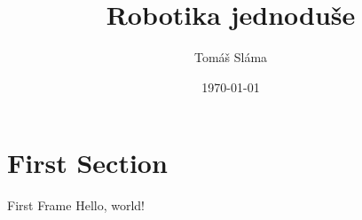 \documentclass[14pt]{beamer}
\title{Robotika jednoduše}
\date{\today}
\author{Tomáš Sláma}
\institute{Gymnázium Turnov}
\begin{document}
  \maketitle

  \section{First Section}

  \begin{frame}{First Frame}
    Hello, world!
  \end{frame}
\end{document}
